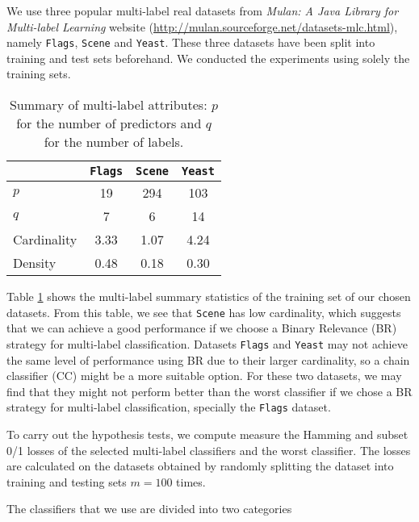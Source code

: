 \documentclass[review]{elsarticle}
\begin{document}
We use three popular multi-label real datasets from \emph{Mulan: A Java Library for Multi-label Learning} website (\url{http://mulan.sourceforge.net/datasets-mlc.html}), namely \texttt{Flags}, \texttt{Scene} and \texttt{Yeast}. These three datasets have been split into training and test sets beforehand. We conducted the experiments using solely the training sets.

\begin{table}[H]
\caption{Summary of multi-label attributes: $p$ for the number of predictors and $q$ for the number of labels.}
\centering
\begin{tabular}{lccc}
  \hline
	  & \texttt{Flags} & \texttt{Scene} & \texttt{Yeast} \\ 
  \hline
 $p$ & 19 & 294 & 103 \\ 
 $q$ & 7 & 6 & 14 \\  
 Cardinality & 3.33 & 1.07 & 4.24\\
 Density & 0.48 & 0.18 & 0.30 \\
    \hline
\end{tabular}
\label{SUMML}
\end{table}

Table \ref{SUMML} shows the multi-label summary statistics of the training set of our chosen datasets. From this table, we see that \texttt{Scene} has low cardinality, which suggests that we can achieve a good performance if we choose a Binary Relevance (BR) strategy for multi-label classification. Datasets \texttt{Flags} and \texttt{Yeast} may not achieve the same level of performance using BR due to their larger cardinality, so a chain classifier (CC) might be a more suitable option. For these two datasets, we may find that they might not perform better than the worst classifier if we chose a BR strategy for multi-label classification, specially the \texttt{Flags} dataset.

To carry out the hypothesis tests, we compute measure the Hamming and subset 0/1 losses of the selected multi-label classifiers and the worst classifier. The losses are calculated on the datasets obtained by randomly splitting the dataset into training and testing sets $m = 100$ times. 

The classifiers that we use are divided into two categories
\end{document}
